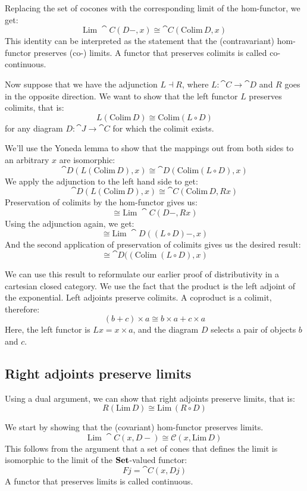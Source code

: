 \documentclass[DaoFP]{subfiles}
\begin{document}
Replacing the set of cocones with the corresponding limit of the hom-functor, we get:
\[ \text{Lim}\; \cat C (D-, x) \cong \cat C( \text{Colim}\,  D, x) \]
This identity can be interpreted as the statement that the (contravariant) hom-functor preserves (co-) limits. A functor that preserves colimits is called co-continuous.

Now suppose that we have the adjunction $L \dashv R$, where $L \colon \cat C \to \cat D$ and $R$ goes in the opposite direction. We want to show that the left functor $L$ preserves colimits, that is:
\[ L (\text{Colim} \, D) \cong \text{Colim} (L \circ D) \]
for any diagram $D \colon \cat J \to \cat C$ for which the colimit exists.

We'll use the Yoneda lemma to show that the mappings out from both sides to an arbitrary $x$ are isomorphic:
\[ \cat D( L (\text{Colim} \, D), x) \cong \cat D (\text{Colim} (L \circ D), x) \]
We apply the adjunction to the left hand side to get:
\[ \cat D( L (\text{Colim} \, D), x) \cong \cat C (\text{Colim}\, D, R x) \]
Preservation of colimits by the hom-functor gives us:
\[ \cong \text{Lim}\; \cat C(D -, R x) \]
Using the adjunction again, we get:
\[ \cong \text{Lim}\; \cat D((L \circ D) -, x) \]
And the second application of preservation of colimits gives us the desired result:
\[ \cong  \cat D((\text{Colim}\;(L \circ D), x) \]

We can use this result to reformulate our earlier proof of distributivity in a cartesian closed category. We use the fact that the product is the left adjoint of the exponential. Left adjoints preserve colimits. A coproduct is a colimit, therefore:
\[(b + c) \times a \cong b \times a + c \times a \]
Here, the left functor is $L x = x \times a$, and the diagram $D$ selects a pair of objects $b$ and $c$. 

\subsection{Right adjoints preserve limits}
Using a dual argument, we can show that right adjoints preserve limits, that is:
\[ R (\text{Lim}\, D) \cong \text{Lim}\, (R \circ D) \]

We start by showing that the (covariant) hom-functor preserves limits. 
\[ \text{Lim}\; \cat C( x, D-) \cong \mathcal{C}(x, \text{Lim}\,D) \]
This follows from the argument that a set of cones that defines the limit is isomorphic to the limit of the $\mathbf{Set}$-valued functor:
\[ F j = \cat C(x, D j) \]
A functor that preserves limits is called continuous.
\end{document}
